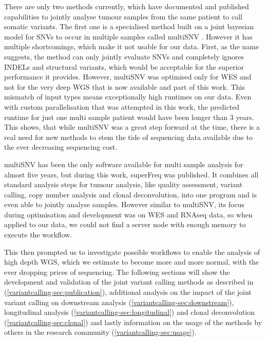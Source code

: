 There are only two methods currently, which have documented and published capabilities to jointly analyse tumour samples from the same patient to call somatic variants. The first one is a specialised method built on a joint bayesian model for SNVs to occur in multiple samples called multiSNV \cite{Josephidou2015}. However it has multiple shortcomings, which make it not usable for our data. First, as the name suggests, the method can only jointly evaluate SNVs and completely ignores INDELs and structural variants, which would be acceptable for the superior performance it provides. However, multiSNV was optimised only for WES and not for the very deep WGS that is now available and part of this work. This mismatch of input types means exceptionally high runtimes on our data. Even with custom parallelisation that was attempted in this work, the predicted runtime for just one multi sample patient would have been longer than 3 years. This shows, that while multiSNV was a great step forward at the time, there is a real need for new methods to stem the tide of sequencing data available due to the ever decreasing sequencing cost.

multiSNV has been the only software available for multi sample analysis for almost five years, but during this work, superFreq \cite{Flensburg2020} was published. It combines all standard analysis steps for tumour analysis, like quality assessment, variant calling, copy number analysis and clonal deconvolution, into one program and is even able to jointly analyse samples. However similar to multiSNV, its focus during optimisation and development was on WES and RNAseq data, so when applied to our data, we could not find a server node with enough memory to execute the workflow.

This then prompted us to investigate possible workflows to enable the analysis of high depth WGS, which we estimate to become more and more normal, with the ever dropping prices of sequencing. The following sections will show the development and validation of the joint variant calling methods as described in \textcite{Hollizeck2021} (\autoref{variantcalling-sec:publication}), additional analysis on the impact of the joint variant calling on downstream analysis (\autoref{variantcalling-sec:downstream}), longitudinal analysis (\autoref{variantcalling-sec:longitudinal}) and clonal deconvolution (\autoref{variantcalling-sec:clonal}) and lastly information on the usage of the methods by others in the research community (\autoref{variantcalling-sec:usage}).

